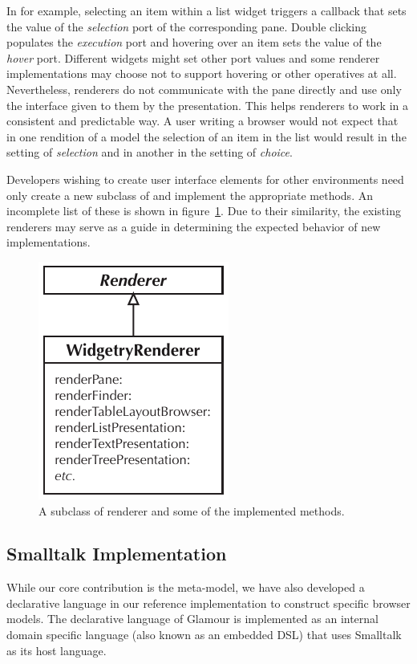 \documentclass[a4paper,10pt,twoside]{book}
\begin{document}
In  for example, selecting an item within a list
widget triggers a callback that sets the value of the \emph{selection}
port of the corresponding pane. Double clicking populates the
\emph{execution} port and hovering over an item sets the value of the
\emph{hover} port. Different widgets might set other port values and
some renderer implementations may choose not to support hovering or
other operatives at all. Nevertheless, renderers do not communicate
with the pane directly and use only the interface given to them by the
presentation. This helps renderers to work in a consistent and
predictable way. A user writing a browser would not expect that in one
rendition of a model the selection of an item in the list would result
in the setting of \emph{selection} and in another in the setting of
\emph{choice}.

Developers wishing to create user interface elements for other
environments need only create a new subclass of  and
implement the appropriate methods. An incomplete list of these is
shown in figure~\ref{fig:renderer}. Due to their similarity, the
existing renderers may serve as a guide in determining the expected
behavior of new implementations.

\begin{figure}[htbp]
\centerline{\includegraphics[width=.2\linewidth]{renderer.pdf}}
\caption{A subclass of renderer and some of the implemented methods.}
\label{fig:renderer}
\end{figure}


\subsection{Smalltalk Implementation}
\label{sec:impl/smalltalk-implementation}

While our core contribution is the meta-model, we have also developed
a declarative language in our reference implementation to construct
specific browser models. The declarative language of Glamour is
implemented as an internal domain specific language (also known as an
embedded DSL) that uses Smalltalk as its host language.
\end{document}
